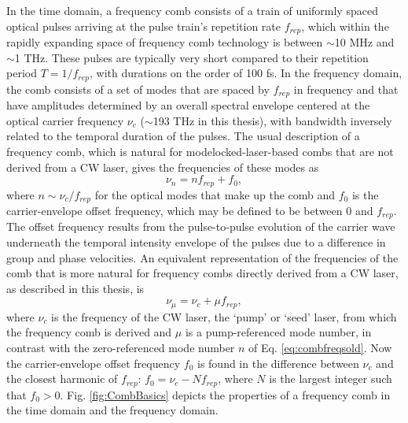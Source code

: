 In the time domain, a frequency comb consists of a train of uniformly spaced optical pulses arriving at the pulse train's repetition rate $f_{rep}$, which within the rapidly expanding space of frequency comb technology is between $\sim$10 MHz and $\sim$1 THz. These pulses are typically very short compared to their repetition period $T=1/f_{rep}$, with durations on the order of 100 fs. In the frequency domain, the comb consists of a set of modes that are spaced by $f_{rep}$ in frequency and that have amplitudes determined by an overall spectral envelope centered at the optical carrier frequency $\nu_c$ ($\sim$193 THz in this thesis), with bandwidth inversely related to the temporal duration of the pulses. The usual description of a frequency comb, which is natural for modelocked-laser-based combs that are not derived from a CW laser, gives the frequencies of these modes as 
\begin{equation}
\nu_n=nf_{rep}+f_0, \label{eq:combfreqsold}
\end{equation} 
where $n\sim \nu_c/f_{rep}$ for the optical modes that make up the comb and $f_0$ is the carrier-envelope offset frequency, which may be defined to be between $0$ and $f_{rep}$. The offset frequency results from the pulse-to-pulse evolution of the carrier wave underneath the temporal intensity envelope of the pulses due to a difference in group and phase velocities. An equivalent representation of the frequencies of the comb that is more natural for frequency combs directly derived from a CW laser, as described in this thesis, is
\begin{equation}
\nu_\mu=\nu_c+\mu f_{rep}, \label{eq:combfreqsnew}
\end{equation} 
where $\nu_c$ is the frequency of the CW laser, the `pump' or `seed' laser, from which the frequency comb is derived and $\mu$ is a pump-referenced mode number, in contrast with the zero-referenced mode number $n$ of Eq. \ref{eq:combfreqsold}. Now the carrier-envelope offset frequency $f_0$ is found in the difference between $\nu_c$ and the closest harmonic of $f_{rep}$: $f_0=\nu_c-N f_{rep}$, where $N$ is the largest integer such that $f_0>0$. Fig. \ref{fig:CombBasics} depicts the properties of a frequency comb in the time domain and the frequency domain.

